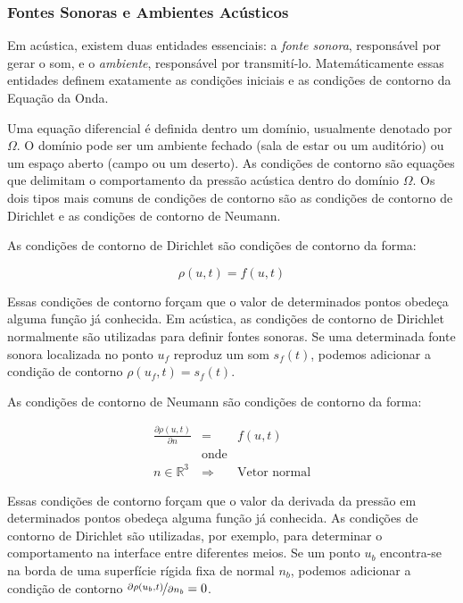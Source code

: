 \subsubsection{Fontes Sonoras e Ambientes Acústicos}

Em acústica, existem duas entidades essenciais: a \emph{fonte sonora}, responsável por gerar o som, e o \emph{ambiente}, responsável por transmití-lo. Matemáticamente essas entidades definem exatamente as condições iniciais e as condições de contorno da Equação da Onda.

Uma equação diferencial é definida dentro um domínio, usualmente denotado por $\Omega$. O domínio pode ser um ambiente fechado (sala de estar ou um auditório) ou um espaço aberto (campo ou um deserto). As condições de contorno são equações que delimitam o comportamento da pressão acústica dentro do domínio $\Omega$. Os dois tipos mais comuns de condições de contorno são as condições de contorno de Dirichlet e as condições de contorno de Neumann.

As condições de contorno de Dirichlet são condições de contorno da forma:

\begin{equation}
	\rho(u, t) = f(u, t)
\end{equation}

Essas condições de contorno forçam que o valor de determinados pontos obedeça alguma função já conhecida. Em acústica, as condições de contorno de Dirichlet normalmente são utilizadas para definir fontes sonoras. Se uma determinada fonte sonora localizada no ponto $u_{f}$ reproduz um som $s_f(t)$, podemos adicionar a condição de contorno $\rho(u_{f}, t) = s_f(t)$.

As condições de contorno de Neumann são condições de contorno da forma:

\begin{eqnarray}
\frac{\partial\rho(u, t)}{\partial n} &=& f(u, t)\\
&\text{onde}& \nonumber \\
n \in \mathbb{R}^3 &\Rightarrow& \text{Vetor normal}\nonumber 
\end{eqnarray}

Essas condições de contorno forçam que o valor da derivada da pressão em determinados pontos obedeça alguma função já conhecida. As condições de contorno de Dirichlet são utilizadas, por exemplo, para determinar o comportamento na interface entre diferentes meios. Se um ponto $u_{b}$ encontra-se na borda de uma superfície rígida fixa de normal $n_b$, podemos adicionar a condição de contorno $\nicefrac{\partial\rho(u_b, t)}{\partial n_b} = 0$.

